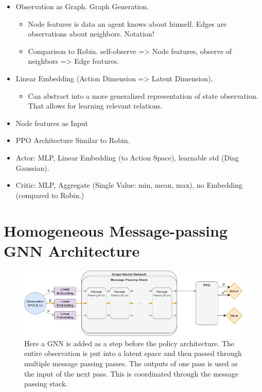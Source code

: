\begin{itemize}[noitemsep,nolistsep]
    \item Observation as Graph. Graph Generation.
    \begin{itemize}[noitemsep,nolistsep]
        \item Node features is data an agent knows about himself. Edges are observations about neighbors. Notation!
        \item Comparison to Robin. self-observe => Node features,  observe of neighbors => Edge features.
    \end{itemize}
    \item Linear Embedding (Action Dimension => Latent Dimension).
    \begin{itemize}[noitemsep,nolistsep]
        \item Can abstract into a more generalized representation of state observation. That allows for learning relevant relations.
    \end{itemize}
    \item Node features as Input
    \item PPO Architecture Similar to Robin. 
    \item Actor: MLP, Linear Embedding (to Action Space), learnable std (Diag Gaussian).
    \item Critic: MLP, Aggregate (Single Value: min, mean, max), no Embedding (compared to Robin.)
\end{itemize}





\section{Homogeneous Message-passing GNN Architecture}
\begin{figure}[htp]
    \centering
    \includegraphics[width=1.0\textwidth]{figures/homogeneous_gnn.png}
    \hspace{1cm}   
    \caption{Here a GNN is added as a step before the policy architecture. The entire observation is put into a latent space and then passed through multiple message passing passes. The outputs of one pass is used as the input of the next pass. This is coordinated through the message passing stack.}
    \label{fig:homogeneous_gnn}
\end{figure}

